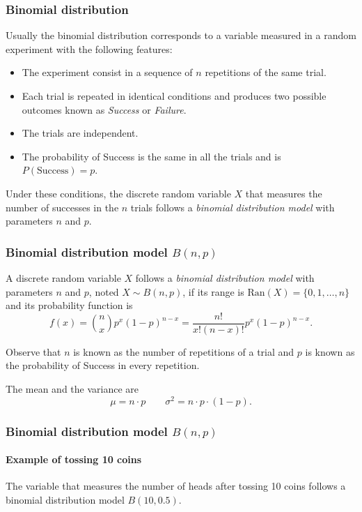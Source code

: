 \begin{frame}
\frametitle{Binomial distribution}
Usually the binomial distribution corresponds to a variable measured in a random experiment with the following features:
\begin{itemize}
\item The experiment consist in a sequence of $n$ repetitions of the same trial.
\item Each trial is repeated in identical conditions and produces two possible outcomes known as \emph{Success} or
\emph{Failure}.
\item The trials are independent.
\item The probability of Success is the same in all the trials and is $P(\mbox{Success})=p$.
\end{itemize}

Under these conditions, the discrete random variable $X$ that measures the number of successes in the $n$ trials follows
a \emph{binomial distribution model} with parameters $n$ and $p$.
\end{frame}


\begin{frame}
\frametitle{Binomial distribution model $B(n,p)$}
\begin{definition}
A discrete random variable $X$ follows a \emph{binomial distribution model} with parameters $n$ and $p$, noted 
$X\sim B(n,p)$, if its range is $\mbox{Ran}(X) = \{0,1,\ldots,n\}$ and its probability function is
\[
f(x) = \binom{n}{x}p^x(1-p)^{n-x} = \frac{n!}{x!(n-x)!}p^x(1-p)^{n-x}.
\]
\end{definition}

Observe that $n$ is known as the number of repetitions of a trial and $p$ is known as the probability of Success in
every repetition. 

The mean and the variance are
\[
\mu = n\cdot p \qquad \sigma^2 = n\cdot p\cdot (1-p).
\]
\end{frame}


\begin{frame}
\frametitle{Binomial distribution model $B(n,p)$}
\framesubtitle{Example of tossing 10 coins}
The variable that measures the number of heads after tossing 10 coins follows a binomial distribution model $B(10,0.5)$.
\begin{center}
\end{center}
\end{frame}


